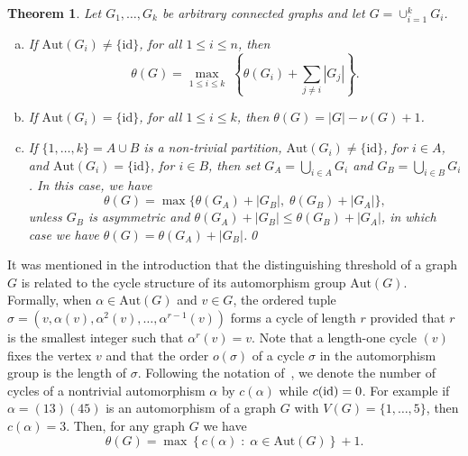 \documentclass[12pt,a4paper, longbibliography]{article}
\newcommand{\id}{\ensuremath{\text{\rm id}}}
\newcommand{\aut}{\mathrm{Aut}}
\newtheorem{theorem}{{\color{THM} Theorem}}[section]
\theoremstyle{definition}
\numberwithin{equation}{section}
\begin{document}
	
	
	\begin{theorem}\label{union}\textnormal{\cite{ShekarrizAhmadiTH2021-theta}}
		Let $G_1,   \ldots, G_k$ be arbitrary connected   graphs and let $G = \cup_{i=1}^{k} G_i$.  
		\begin{enumerate}[(a)]
			\item If $\aut(G_i) \ne \{\mathrm{id}\}$, for all $1 \leq i \leq n$, then 
			\[\theta(G) = \max_{1\leq i\leq k} \; \left\{\theta(G_i) + \sum_{j \neq i}|G_j| \right\}.\]
			
			\item  If $\aut(G_i) = \{\mathrm{id}\}$, for all $1 \leq i \leq k$, then $\theta(G)=|G|-\nu(G)+1$.
			
			\item If $\{1,\ldots,k\}=A\cup B$ is a non-trivial partition, $\aut(G_i) \ne  \{\mathrm{id}\}$, for $i\in A$, and $\aut(G_i) = \{\mathrm{id}\}$, for  $i \in B$, then set  $G_A = \bigcup_{i \in A} G_i$ and $G_B = \bigcup_{i \in B} G_i$. In this case, we have
			\[\theta(G) = \max \{ \theta(G_A) + |G_B|,\; \theta(G_B) + |G_A| \},\]
			unless   $G_B$ is asymmetric and $\theta(G_A) + |G_B|\leq  \theta(G_B) + |G_A|$, in which case  we have $\theta(G) = \theta(G_A) + |G_B|$.\qed
		\end{enumerate}
	\end{theorem}
	
	It was mentioned in the introduction that the distinguishing threshold of a graph $G$ is related to  the cycle structure of its automorphism group $\aut(G)$. Formally, when $\alpha\in\aut (G)$ and $v\in G$, the ordered tuple  $\sigma=(v, \alpha(v), \alpha^2 (v),\ldots,\alpha^{r-1} (v))$ forms a cycle of length $r$ provided that $r$ is the smallest integer such that  $\alpha^{r}(v)=v$. Note that a length-one cycle $(v)$ fixes the vertex $v$ and that the order $o(\sigma)$ of a cycle $\sigma$ in the automorphism group is the length of $\sigma$. Following the notation of~\cite{ShekarrizAhmadiTH2021-theta}, we denote the number of cycles of a nontrivial automorphism $\alpha$  by $c( \alpha)$ while $c(\id)=0$. For example if $\alpha=(1 3)(4 5)$ is an automorphism of a graph $G$ with $V(G)=\{1,\ldots,5\}$, then $c( \alpha)=3$.  Then, for any graph $G$ we have~\cite{ShekarrizAhmadiTH2021-theta}
	\begin{equation}\label{max-lem}
		\theta(G)=\max\left\{c(\alpha)\;:\; \alpha\in \aut(G)\right\}+1.
	\end{equation}
	
		
	
\end{document}
